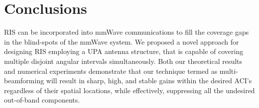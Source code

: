 \section{Conclusions}
\label{sec:conclusions}
RIS can be incorporated into mmWave communications to fill the coverage gaps in the blind-spots of the mmWave system. We proposed a novel approach for designing RIS employing a UPA antenna structure, that is capable of covering multiple disjoint angular intervals simultaneously. Both our theoretical results and numerical experiments demonstrate that our technique termed as multi-beamforming will result in sharp, high, and stable gains within the desired ACI's regardless of their spatial locations, while effectively, suppressing all the undesired out-of-band components. 

